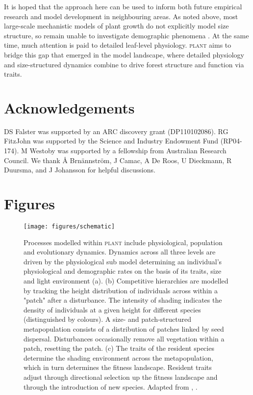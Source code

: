 \documentclass[a4paper,11pt]{article}
\newcommand{\plant}{\textsc{plant}}
\begin{document}
It is hoped that the approach here can be used to inform both future empirical
research and model development in neighbouring areas. As noted above, most
large-scale mechanistic models of plant growth do not explicitly model size
structure, so remain unable to investigate demographic phenomena
\citep{Cramer-2001, Sitch-2003, Kelley-2013,Dekauwe-2014}. At the same time,
much attention is paid to detailed leaf-level physiology. {\plant} aims to bridge
this gap that emerged in the model landscape, where detailed physiology and
size-structured dynamics combine to drive forest structure and function via
traits.

\section{Acknowledgements}

DS Falster was supported by an ARC discovery grant (DP110102086). RG
FitzJohn was supported by the Science and Industry Endowment Fund
(RP04-174). M Westoby was supported by a fellowship from Australian
Research Council. We thank {\AA} Brn{\"a}nnstr{\"o}m, J Camac, 
A De Roos, U Dieckmann, R Duursma, and J Johansson for helpful discussions. 

\clearpage


\clearpage

\section{Figures}\label{figures}

\begin{figure}[h!]
\centering
\texttt{[image: figures/schematic]}

\caption{Processes modelled within {\plant} include physiological, population and
evolutionary dynamics.
Dynamics across all three levels are driven by the
physiological sub model determining an individual's physiological and
demographic rates on the basis of its traits, size and light environment (a).
(b) Competitive hierarchies  are modelled by tracking the height distribution of
individuals across within a "patch" after a disturbance. The intensity
of shading indicates the density of individuals at a given height for
different species (distinguished by colours). A size- and patch-structured
metapopulation consists of a distribution of patches linked by seed dispersal.
Disturbances occasionally remove all vegetation within a patch, resetting the
patch. (c) The traits of the resident species determine the shading environment
across the metapopulation, which in turn determines the fitness landscape.
Resident traits adjust through directional selection up the fitness landscape
and through the introduction of new species. Adapted from
\citet{Falster-2011}, \citet{Falster-2015}. }

\label{fig:schematic}
\end{figure}
\end{document}
